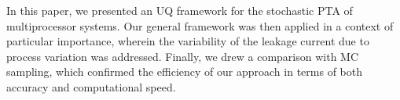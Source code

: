 In this paper, we presented an UQ framework for the stochastic PTA of multiprocessor systems. Our general framework was then applied in a context of particular importance, wherein the variability of the leakage current due to process variation was addressed. Finally, we drew a comparison with MC sampling, which confirmed the efficiency of our approach in terms of both accuracy and computational speed.
